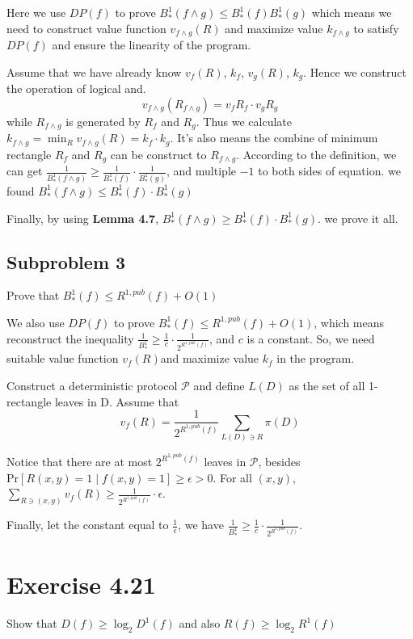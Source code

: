 \documentclass[11pt, fleqn, a4paper]{report}
\begin{document}
Here we use $DP(f)$ to prove $B_{*}^{1}(f \land g) \leq B_{*}^{1}(f)B_{*}^{1}(g)$ which means we need to construct value function $v_{f \land g}(R)$ and maximize value $k_{f \land g}$ to satisfy $DP(f)$ and ensure the linearity of the program.

Assume that we have already know $v_{f}(R)$, $k_f$, $v_g(R)$, $k_{g}$. Hence we construct the operation of logical and.
$$v_{f \land g}(R_{f \land g}) = v_f{R_f} \cdot v_g{R_g}$$while $R_{f \land g}$ is generated by $R_f$ and $R_g$.
Thus we calculate $k_{f \land g} = \min_{R}{v_{f \land g}(R)} = k_{f} \cdot k_{g}$. It's also means the combine of minimum rectangle $R_f$ and $R_g$ can be construct to $R_{f \land g}$.  According to the definition, we can get $\frac{1}{B_{*}^{1}(f \land g)} \geq \frac{1}{B_{*}^{1}(f)} \cdot \frac{1}{B_{*}^{1}(g)}$, and multiple $-1$ to both sides of equation. we found $B_{*}^{1}(f \land g) \leq B_{*}^1(f) \cdot B_{*}^1(g)$

Finally, by using \textbf{Lemma 4.7}, $B_{*}^{1}(f \land g) \geq B_{*}^1(f) \cdot B_{*}^1(g)$. we prove it all.

\subsection*{Subproblem 3}
Prove that $B_{*}^{1}(f) \leq R^{1,pub}(f) + O(1)$

We also use $DP(f)$ to prove $B_{*}^{1}(f) \leq R^{1,pub}(f) + O(1)$, which means reconstruct the inequality $\frac{1}{B_{*}^{1}} \geq \frac{1}{c}\cdot\frac{1}{2^{R^{1,pub}(f)}}$, and $c$ is a constant. So, we need suitable value function $v_f(R)$and maximize value $k_f$ in the program.

Construct a deterministic protocol $\mathcal{P}$ and define $L(D)$ as the set of all 1-rectangle leaves in D. Assume that $$v_f(R) = \frac{1}{2^{R^{1,pub}(f)}}\sum_{L(D) \ni R}{\pi(D)}$$

Notice that there are at most $2^{R^{1,pub}(f)}$ leaves in $\mathcal{P}$, besides $\mathrm{Pr}[ R(x,y) = 1 \mid f(x,y) = 1 ] \geq \epsilon > 0$. For all $(x,y)$, $\sum_{R \ni (x, y)}{v_f(R)} \geq  \frac{1}{2^{R^{1,pub}(f)}} \cdot \epsilon$.

Finally, let the constant equal to $\frac{1}{\epsilon}$, we have $\frac{1}{B_{*}^{1}} \geq \frac{1}{c}\cdot\frac{1}{2^{R^{1,pub}(f)}}$. 

\section*{Exercise 4.21}
Show that $D(f) \geq \log_2{D^1(f)}$ and also $R(f) \geq \log_2{R^1(f)}$
\end{document}
